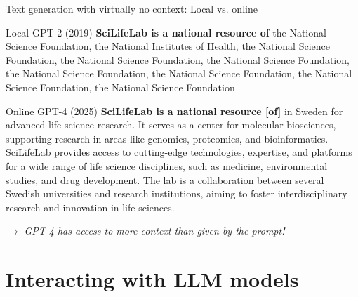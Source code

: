 \documentclass[10pt]{beamer}
\newcommand{\remark}[1]{{\par \color{scGrape} \ensuremath{\rightarrow} \emph{#1}}}
\begin{document}
\begin{frame}{Text generation with virtually no context: Local vs. online}
	
	\begin{alertblock}{Local GPT-2 (2019) }
		\small
		\textbf{SciLifeLab is a national resource of} the National Science Foundation, the National Institutes of Health, the National Science Foundation, the National Science Foundation, the National Science Foundation, the National Science Foundation, the National Science Foundation, the National Science Foundation, the National Science Foundation
	\end{alertblock}
	
	\begin{alertblock}{Online GPT-4 (2025)}
		\small
		\textbf{SciLifeLab is a national resource [of]} in Sweden for advanced life science research. It serves as a center for molecular biosciences, supporting research in areas like genomics, proteomics, and bioinformatics. SciLifeLab provides access to cutting-edge technologies, expertise, and platforms for a wide range of life science disciplines, such as medicine, environmental studies, and drug development. The lab is a collaboration between several Swedish universities and research institutions, aiming to foster interdisciplinary research and innovation in life sciences.
	\end{alertblock}
	\remark{GPT-4 has access to more context than given by the prompt!}
\end{frame}




\section{Interacting with LLM models}

\end{document}

